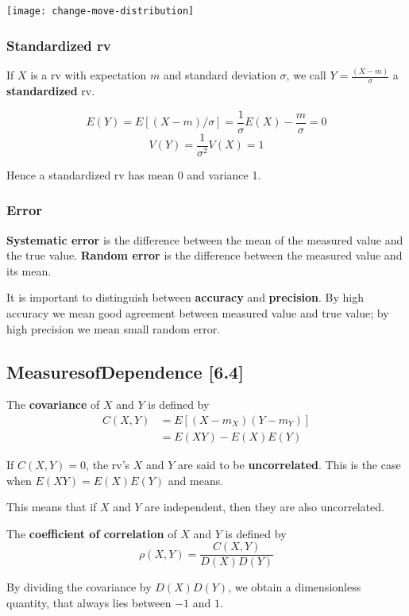 \documentclass[a4paper,9pt]{extarticle}
\begin{document}
\begin{multicols*}{2}
{\centering \texttt{[image: change-move-distribution]} \par}

\subsubsection{Standardized rv}

If $X$ is a rv with expectation $m$ and standard deviation $\sigma$, we call $Y = \frac{(X - m)}{\sigma}$ a \textbf{standardized} rv.

\begin{equation}
    E(Y) = E[(X - m) / \sigma] = \frac{1}{\sigma} E(X) - \frac{m}{\sigma} = 0
\end{equation}
\begin{equation}
    V(Y) = \frac{1}{\sigma^2} V(X) = 1
\end{equation}

Hence a standardized rv has mean 0 and variance 1.

\subsubsection{Error}

\textbf{Systematic error} is the difference between the mean of the measured value and the true value. \textbf{Random error} is the difference between the measured value and its mean.

It is important to distinguish between \textbf{accuracy} and \textbf{precision}. By high accuracy we mean good agreement between measured value and true value; by high precision we mean small random error.

\subsection{MeasuresofDependence [6.4]}
The \textbf{covariance} of $X$ and $Y$ is defined by
\begin{equation}
    \begin{split}
        C(X,Y) & = E[(X - m_X)(Y - m_Y)] \\
        & = E(XY) - E(X) E(Y)
    \end{split}
\end{equation}

If $C(X, Y) = 0$, the rv's $X$ and $Y$ are said to be \textbf{uncorrelated}. This is the case when $E(XY) = E(X)E(Y)$ and means.

This means that if $X$ and $Y$ are independent, then they are also uncorrelated.

The \textbf{coefficient of correlation} of $X$ and $Y$ is defined by
\begin{equation}
    \rho(X, Y) = \frac{C(X,Y)}{D(X)D(Y)}
\end{equation}

By dividing the covariance by $D(X)D(Y)$, we obtain a dimensionless quantity, that always lies between $-1$ and $1$.

\end{multicols*}
\end{document}

